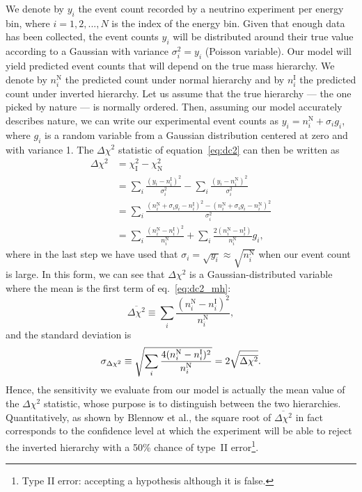 We denote by $y_i$ the event count recorded by a neutrino experiment per energy
bin, where $i = 1, 2, ..., N$ is the index of the energy bin.
Given that enough data has been collected,
the event counts $y_i$ will be distributed around their true value
according to a Gaussian with variance $\sigma^2_i=y_i$ (Poisson variable). 
Our model will yield predicted event counts that will depend on
the true mass hierarchy.  We denote by $n^\text{N}_i$ the predicted count under normal
hierarchy and by $n^\text{I}_i$ the predicted count under inverted hierarchy.
Let us assume that the true hierarchy --- the one picked by nature --- is normally
ordered. Then, assuming our model accurately describes nature,  we can write
our experimental event counts as $y_i = n^\text{N}_i + \sigma_i g_i$, where
$g_i$ is a random variable from a Gaussian distribution centered at zero and
with variance 1.
The $\Delta \chi^2$ statistic of equation~\ref{eq:dc2} can then be written as
\begin{align}
	\Delta \chi^2 &= \chi_\text{I}^2 - \chi_\text{N}^2\nonumber\\
	&= \sum_i \frac{(y_i - n^\text{I}_i)^2}{\sigma_i^2} - \sum_i \frac{(y_i -
	n^\text{N}_i)^2}{\sigma_i^2}\nonumber\\
	&= \sum_i \frac{(n^\text{N}_i + \sigma_i g_i - n^\text{I}_i)^2 - (n^\text{N}_i + \sigma_i g_i -
	n^\text{N}_i)^2}{\sigma_i^2}\nonumber\\
	&= \sum_i \frac{(n^\text{N}_i - n^\text{I}_i)^2}{n^\text{N}_i} + \sum_i
	\frac{2(n^\text{N}_i -
	n^\text{I}_i)}{n^\text{N}_i} g_i,\label{eq:dc2_mh}
\end{align}
where in the last step we have used that $\sigma_i = \sqrt{y_i} \approx \sqrt{n^\text{N}_i}$
when our event count is large.
In this form, we can see that $\Delta \chi^2$ is a Gaussian-distributed
variable where the mean is the first term of eq.~\ref{eq:dc2_mh}:
\begin{equation}
	\overline{\Delta\chi^2} \equiv \sum_i \frac{(n^\text{N}_i -
n^\text{I}_i)^2}{n^\text{N}_i},\label{eq:mean_dc2_mh}\end{equation}
and the standard deviation is
$$\sigma_{\Delta\chi^2} \equiv \sqrt{\sum_i \frac{4(n^\text{N}_i -
n^\text{I}_i)^2}{n^\text{N}_i}}\\
= 2\sqrt{\overline{\Delta\chi^2}}.$$
Hence, the sensitivity we evaluate from our model is actually the mean value of
the $\Delta\chi^2$ statistic, whose purpose is to distinguish between the two
hierarchies. Quantitatively, as shown by Blennow et al.\cite{blennow}, the square root of
$\overline{\Delta\chi^2}$ in fact corresponds to the confidence level at which the
experiment will be able to reject the inverted hierarchy with a 50\% chance of
type~II error\footnote{Type II error: accepting a hypothesis although it is
false.}. 

